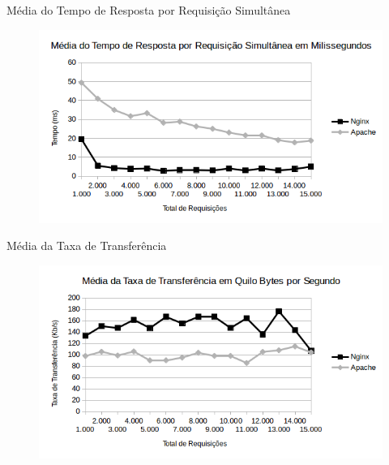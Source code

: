 \begin{frame}{Média do Tempo de Resposta por Requisição Simultânea}
	\begin{figure}
		\centering
		\includegraphics[width=1\linewidth]{../graficos/grafico5} 
	\end{figure}
\end{frame}

\begin{frame}{Média da Taxa de Transferência}
	\begin{figure}
		\centering
		\includegraphics[width=1\linewidth]{../graficos/grafico6} 
	\end{figure}
\end{frame}

